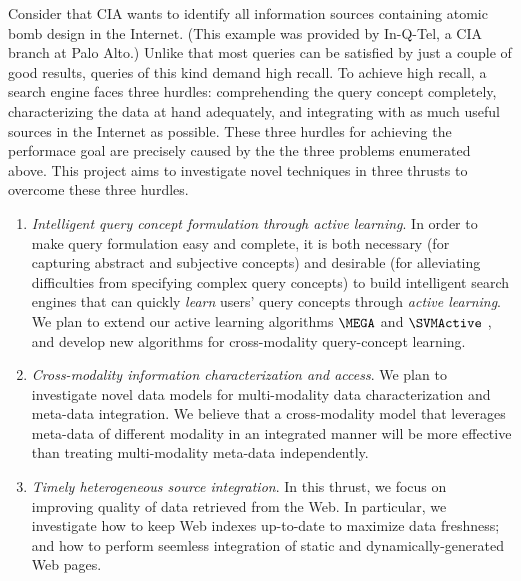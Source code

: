 Consider that CIA wants to identify all information sources 
containing atomic bomb design in the Internet.
(This example was provided by In-Q-Tel, a CIA branch at Palo Alto.)
Unlike that most queries can be satisfied by just a couple of
good results, queries of this kind demand high recall.
To achieve high recall, a search engine
faces three hurdles:
comprehending the query concept completely, 
characterizing the data at hand adequately, 
and integrating with as much useful sources in the Internet 
as possible.
These three hurdles for achieving the performace goal are
precisely caused by the the three problems enumerated above.
This project aims to investigate novel 
techniques in three thrusts to overcome these three hurdles.

\begin{enumerate}
\item {\em Intelligent query concept formulation through active learning}.
 In order to make query formulation easy and complete, it is both
 necessary (for capturing abstract and subjective concepts) and
 desirable (for alleviating difficulties from specifying complex query
 concepts) to build intelligent search engines that can quickly {\em
 learn} users' query concepts through {\em active learning}.  We plan
 to extend our active learning algorithms $\MEGA$ 
 and $\SVMActive$ \cite{LCL01,SVM01},
 and develop new algorithms for
 cross-modality query-concept learning.

\item {\em Cross-modality information characterization and access}.
 We plan to investigate novel data models for multi-modality data
 characterization and meta-data integration.  We believe that a
 cross-modality model that leverages meta-data of different modality
 in an integrated manner will be more effective than treating
 multi-modality meta-data independently.

\item {\em Timely heterogeneous source integration}. 
 In this thrust, we focus on improving quality of data retrieved from
 the Web.  In particular, we investigate how to keep Web indexes
 up-to-date to maximize data freshness; and how to perform seemless
 integration of static and dynamically-generated Web pages.
\end{enumerate}

